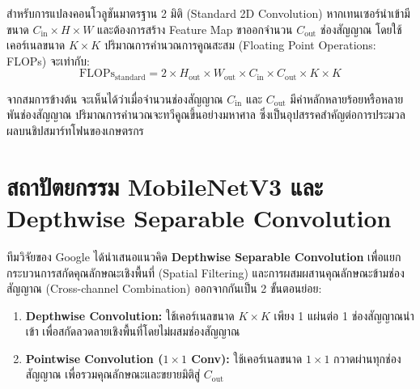 สำหรับการแปลงคอนโวลูชันมาตรฐาน 2 มิติ (Standard 2D Convolution) หากเทนเซอร์นำเข้ามีขนาด $C_{\text{in}} \times H \times W$ และต้องการสร้าง Feature Map ขาออกจำนวน $C_{\text{out}}$ ช่องสัญญาณ โดยใช้เคอร์เนลขนาด $K \times K$ ปริมาณการคำนวณการคูณสะสม (Floating Point Operations: FLOPs) จะเท่ากับ:
\begin{equation}
\text{FLOPs}_{\text{standard}} = 2 \times H_{\text{out}} \times W_{\text{out}} \times C_{\text{in}} \times C_{\text{out}} \times K \times K
\end{equation}

จากสมการข้างต้น จะเห็นได้ว่าเมื่อจำนวนช่องสัญญาณ $C_{\text{in}}$ และ $C_{\text{out}}$ มีค่าหลักหลายร้อยหรือหลายพันช่องสัญญาณ ปริมาณการคำนวณจะทวีคูณขึ้นอย่างมหาศาล ซึ่งเป็นอุปสรรคสำคัญต่อการประมวลผลบนชิปสมาร์ทโฟนของเกษตรกร

\section{สถาปัตยกรรม MobileNetV3 และ Depthwise Separable Convolution}

ทีมวิจัยของ Google ได้นำเสนอแนวคิด \textbf{Depthwise Separable Convolution} เพื่อแยกกระบวนการสกัดคุณลักษณะเชิงพื้นที่ (Spatial Filtering) และการผสมผสานคุณลักษณะข้ามช่องสัญญาณ (Cross-channel Combination) ออกจากกันเป็น 2 ขั้นตอนย่อย:

\begin{enumerate}[leftmargin=1.5em, itemsep=3pt]
    \item \textbf{Depthwise Convolution:} ใช้เคอร์เนลขนาด $K \times K$ เพียง 1 แผ่นต่อ 1 ช่องสัญญาณนำเข้า เพื่อสกัดลวดลายเชิงพื้นที่โดยไม่ผสมช่องสัญญาณ
    \item \textbf{Pointwise Convolution ($1 \times 1$ Conv):} ใช้เคอร์เนลขนาด $1 \times 1$ กวาดผ่านทุกช่องสัญญาณ เพื่อรวมคุณลักษณะและขยายมิติสู่ $C_{\text{out}}$
\end{enumerate}

